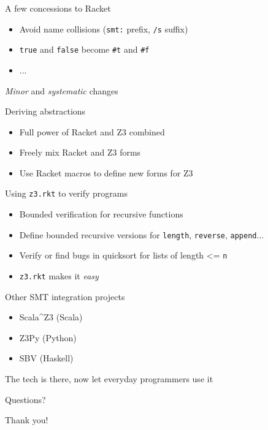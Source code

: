 \documentclass{beamer}
\begin{document}
\begin{frame}{A few concessions to Racket}
\begin{itemize}
\item Avoid name collisions (\texttt{smt:} prefix, \texttt{/s} suffix)
\item \texttt{true} and \texttt{false} become \texttt{\#t} and \texttt{\#f}
\item ...
\end{itemize}
\pause
\textit{Minor} and \textit{systematic} changes
\end{frame}

\begin{frame}{Deriving abstractions}
\begin{itemize}
\item Full power of Racket and Z3 combined
\item Freely mix Racket and Z3 forms
\pause
\item Use Racket macros to define new forms for Z3
\end{itemize}
\end{frame}

\begin{frame}{Using \texttt{z3.rkt} to verify programs}
\begin{itemize}
\item Bounded verification for recursive functions
\item Define bounded recursive versions for \texttt{length}, \texttt{reverse}, \texttt{append}...
\pause
\item Verify or find bugs in quicksort for lists of length <= \texttt{n}
\pause
\item \texttt{z3.rkt} makes it \textit{easy}
\end{itemize}
\end{frame}

\begin{frame}{Other SMT integration projects}
\begin{itemize}
\item Scala\textasciicircum Z3 (Scala)
\item Z3Py (Python)
\item SBV (Haskell)
\end{itemize}
\pause
The tech is there, now let everyday programmers use it
\end{frame}

\begin{frame}{Questions?}
\begin{center}
Thank you!
\end{center}
\end{frame}
\end{document}

